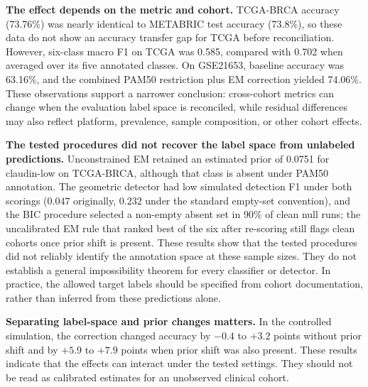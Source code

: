 \documentclass[11pt,a4paper]{article}
\begin{document}
\textbf{The effect depends on the metric and cohort.} TCGA-BRCA accuracy (73.76\%) was nearly
identical to METABRIC test accuracy (73.8\%), so these data do not show an accuracy transfer gap
for TCGA before reconciliation. However, six-class macro F1 on TCGA was 0.585, compared with
0.702 when averaged over its five annotated classes. On GSE21653, baseline accuracy was 63.16\%,
and the combined PAM50 restriction plus EM correction yielded 74.06\%. These observations support
a narrower conclusion: cross-cohort metrics can change when the evaluation label space is
reconciled, while residual differences may also reflect platform, prevalence, sample composition,
or other cohort effects.

\textbf{The tested procedures did not recover the label space from unlabeled predictions.}
Unconstrained EM retained an estimated prior of 0.0751 for claudin-low on TCGA-BRCA, although
that class is absent under PAM50 annotation. The geometric detector had low simulated detection
F1 under both scorings ($0.047$ originally, $0.232$ under the standard empty-set convention),
and the BIC procedure selected a non-empty absent set in 90\% of clean null runs; the
uncalibrated EM rule that ranked best of the six after re-scoring still flags clean cohorts
once prior shift is present.
These results show that the tested procedures did not reliably identify the annotation space at
these sample sizes. They do not establish a general impossibility theorem for every classifier
or detector. In practice, the allowed target labels should be specified from cohort documentation,
rather than inferred from these predictions alone.

\textbf{Separating label-space and prior changes matters.} In the controlled simulation, the
correction changed accuracy by $-0.4$ to $+3.2$ points without prior shift and by $+5.9$ to
$+7.9$ points when prior shift was also present. These results indicate that the effects can
interact under the tested settings. They should not be read as calibrated estimates for an
unobserved clinical cohort.
\end{document}
